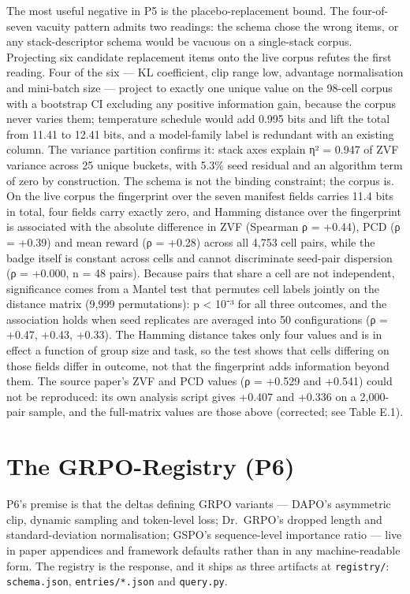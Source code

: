\documentclass[12pt,a4paper]{report}
\begin{document}
The most useful negative in P5 is the placebo-replacement bound. The
four-of-seven vacuity pattern admits two readings: the schema chose the
wrong items, or any stack-descriptor schema would be vacuous on a
single-stack corpus. Projecting six candidate replacement items onto the
live corpus refutes the first reading. Four of the six --- KL
coefficient, clip range low, advantage normalisation and mini-batch size
--- project to exactly one unique value on the 98-cell corpus with a
bootstrap CI excluding any positive information gain, because the corpus
never varies them; temperature schedule would add 0.995 bits and lift
the total from 11.41 to 12.41 bits, and a model-family label is
redundant with an existing column. The variance partition confirms it:
stack axes explain η² = 0.947 of ZVF variance across 25 unique buckets,
with 5.3\% seed residual and an algorithm term of zero by construction.
The schema is not the binding constraint; the corpus is. On the live
corpus the fingerprint over the seven manifest fields carries 11.4 bits
in total, four fields carry exactly zero, and Hamming distance over the
fingerprint is associated with the absolute difference in ZVF (Spearman
ρ = +0.44), PCD (ρ = +0.39) and mean reward (ρ = +0.28) across all 4,753
cell pairs, while the badge itself is constant across cells and cannot
discriminate seed-pair dispersion (ρ = +0.000, n = 48 pairs). Because
pairs that share a cell are not independent, significance comes from a
Mantel test that permutes cell labels jointly on the distance matrix
(9,999 permutations): p \textless{} 10⁻³ for all three outcomes, and the
association holds when seed replicates are averaged into 50
configurations (ρ = +0.47, +0.43, +0.33). The Hamming distance takes
only four values and is in effect a function of group size and task, so
the test shows that cells differing on those fields differ in outcome,
not that the fingerprint adds information beyond them. The source
paper's ZVF and PCD values (ρ = +0.529 and +0.541) could not be
reproduced: its own analysis script gives +0.407 and +0.336 on a
2,000-pair sample, and the full-matrix values are those above
(corrected; see Table E.1).

\section{The GRPO-Registry (P6)}\label{the-grpo-registry-p6}

P6's premise is that the deltas defining GRPO variants --- DAPO's
asymmetric clip, dynamic sampling and token-level loss; Dr.~GRPO's
dropped length and standard-deviation normalisation; GSPO's
sequence-level importance ratio \citep{zheng2025gspo} --- live in paper
appendices and framework defaults rather than in any machine-readable
form. The registry is the response, and it ships as three artifacts at
\texttt{registry/}: \texttt{schema.json}, \texttt{entries/*.json} and
\texttt{query.py}.
\end{document}
